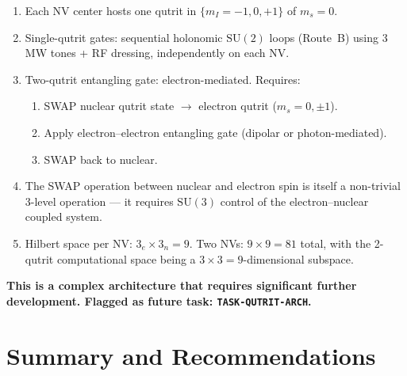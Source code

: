 \documentclass[11pt,letterpaper]{article}
\newcommand{\SU}{\mathrm{SU}}
\begin{document}
\begin{enumerate}
  \item Each NV center hosts one qutrit in $\{m_I = -1, 0, +1\}$ of $m_s = 0$.
  \item Single-qutrit gates: sequential holonomic $\SU(2)$ loops (Route~B) using 3 MW
    tones + RF dressing, independently on each NV.
  \item Two-qutrit entangling gate: electron-mediated. Requires:
    \begin{enumerate}
      \item SWAP nuclear qutrit state $\to$ electron qutrit ($m_s = 0, \pm 1$).
      \item Apply electron--electron entangling gate (dipolar or photon-mediated).
      \item SWAP back to nuclear.
    \end{enumerate}
  \item The SWAP operation between nuclear and electron spin is itself a non-trivial
    3-level operation --- it requires $\SU(3)$ control of the electron--nuclear coupled
    system.
  \item Hilbert space per NV: $3_e \times 3_n = 9$. Two NVs: $9 \times 9 = 81$ total,
    with the 2-qutrit computational space being a $3 \times 3 = 9$-dimensional subspace.
\end{enumerate}

\textbf{This is a complex architecture that requires significant further development.
Flagged as future task: \texttt{TASK-QUTRIT-ARCH}.}


\section{Summary and Recommendations}
\label{sec:summary}
\end{document}
